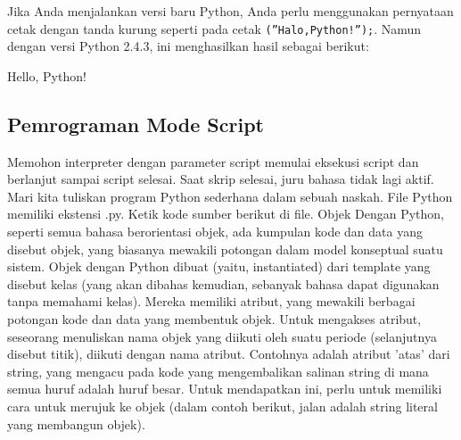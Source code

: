 Jika Anda menjalankan versi baru Python, Anda perlu menggunakan pernyataan cetak dengan tanda kurung seperti pada cetak \verb|(”Halo,Python!”);|. Namun dengan versi Python 2.4.3, ini menghasilkan hasil sebagai berikut:

Hello, Python!

\subsection{Pemrograman Mode Script}
Memohon interpreter dengan parameter script memulai eksekusi script dan berlanjut sampai script selesai. Saat skrip selesai, juru bahasa tidak lagi aktif. Mari kita tuliskan program Python sederhana dalam sebuah naskah. File Python memiliki ekstensi .py. Ketik kode sumber berikut di ﬁle.
Objek Dengan Python, seperti semua bahasa berorientasi objek, ada kumpulan kode dan data yang disebut objek, yang biasanya mewakili potongan dalam model konseptual suatu sistem. Objek dengan Python dibuat (yaitu, instantiated) dari template yang disebut kelas (yang akan dibahas kemudian, sebanyak bahasa dapat digunakan tanpa memahami kelas). Mereka memiliki atribut, yang mewakili berbagai potongan kode dan data yang membentuk objek. Untuk mengakses atribut, seseorang menuliskan nama objek yang diikuti oleh suatu periode (selanjutnya disebut titik), diikuti dengan nama atribut.
Contohnya adalah atribut ’atas’ dari string, yang mengacu pada kode yang mengembalikan salinan string di mana semua huruf adalah huruf besar. Untuk mendapatkan ini, perlu untuk memiliki cara untuk merujuk ke objek (dalam contoh berikut, jalan adalah string literal yang membangun objek).

